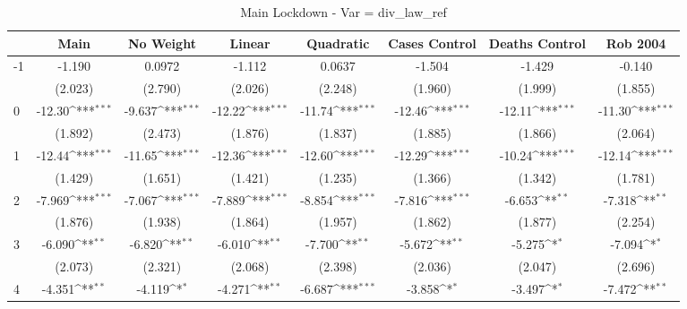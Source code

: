 \documentclass{article}
\begin{document}
{
\def\sym#1{\ifmmode^{#1}\else\(^{#1}\)\fi}
\begin{longtable}{l*{7}{c}}
\caption{Main Lockdown - Var = div\_law\_ref}\\
\hline\hline\endfirsthead\hline\endhead\hline\endfoot\endlastfoot
                &\multicolumn{1}{c}{Main}&\multicolumn{1}{c}{No Weight}&\multicolumn{1}{c}{Linear}&\multicolumn{1}{c}{Quadratic}&\multicolumn{1}{c}{Cases Control}&\multicolumn{1}{c}{Deaths Control}&\multicolumn{1}{c}{Rob 2004}\\
\hline
-1              &   -1.190         &   0.0972         &   -1.112         &   0.0637         &   -1.504         &   -1.429         &   -0.140         \\
                &  (2.023)         &  (2.790)         &  (2.026)         &  (2.248)         &  (1.960)         &  (1.999)         &  (1.855)         \\
0               &   -12.30\sym{***}&   -9.637\sym{***}&   -12.22\sym{***}&   -11.74\sym{***}&   -12.46\sym{***}&   -12.11\sym{***}&   -11.30\sym{***}\\
                &  (1.892)         &  (2.473)         &  (1.876)         &  (1.837)         &  (1.885)         &  (1.866)         &  (2.064)         \\
1               &   -12.44\sym{***}&   -11.65\sym{***}&   -12.36\sym{***}&   -12.60\sym{***}&   -12.29\sym{***}&   -10.24\sym{***}&   -12.14\sym{***}\\
                &  (1.429)         &  (1.651)         &  (1.421)         &  (1.235)         &  (1.366)         &  (1.342)         &  (1.781)         \\
2               &   -7.969\sym{***}&   -7.067\sym{***}&   -7.889\sym{***}&   -8.854\sym{***}&   -7.816\sym{***}&   -6.653\sym{**} &   -7.318\sym{**} \\
                &  (1.876)         &  (1.938)         &  (1.864)         &  (1.957)         &  (1.862)         &  (1.877)         &  (2.254)         \\
3               &   -6.090\sym{**} &   -6.820\sym{**} &   -6.010\sym{**} &   -7.700\sym{**} &   -5.672\sym{**} &   -5.275\sym{*}  &   -7.094\sym{*}  \\
                &  (2.073)         &  (2.321)         &  (2.068)         &  (2.398)         &  (2.036)         &  (2.047)         &  (2.696)         \\
4               &   -4.351\sym{**} &   -4.119\sym{*}  &   -4.271\sym{**} &   -6.687\sym{***}&   -3.858\sym{*}  &   -3.497\sym{*}  &   -7.472\sym{**} \\

\end{longtable}}
\end{document}
